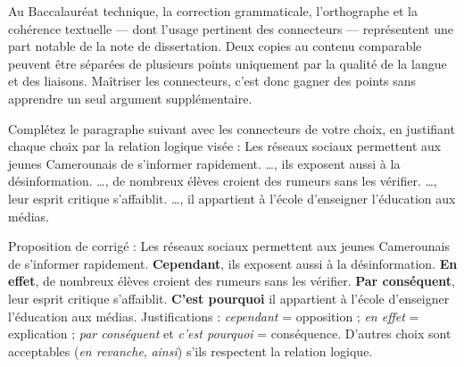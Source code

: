 \documentclass[11pt]{article}
\begin{document}
\begin{savaistu}
Au Baccalauréat technique, la correction grammaticale, l'orthographe et la cohérence textuelle --- dont l'usage pertinent des connecteurs --- représentent une part notable de la note de dissertation. Deux copies au contenu comparable peuvent être séparées de plusieurs points uniquement par la qualité de la langue et des liaisons. Maîtriser les connecteurs, c'est donc gagner des points sans apprendre un seul argument supplémentaire.
\end{savaistu}

\begin{exercice}
Complétez le paragraphe suivant avec les connecteurs de votre choix, en justifiant chaque choix par la relation logique visée : \og Les réseaux sociaux permettent aux jeunes Camerounais de s'informer rapidement. \dots{}, ils exposent aussi à la désinformation. \dots{}, de nombreux élèves croient des rumeurs sans les vérifier. \dots{}, leur esprit critique s'affaiblit. \dots{}, il appartient à l'école d'enseigner l'éducation aux médias. \fg{}
\end{exercice}

\begin{corrige}[Exercice]
Proposition de corrigé : \og Les réseaux sociaux permettent aux jeunes Camerounais de s'informer rapidement. \textbf{Cependant}, ils exposent aussi à la désinformation. \textbf{En effet}, de nombreux élèves croient des rumeurs sans les vérifier. \textbf{Par conséquent}, leur esprit critique s'affaiblit. \textbf{C'est pourquoi} il appartient à l'école d'enseigner l'éducation aux médias. \fg{} Justifications : \emph{cependant} = opposition ; \emph{en effet} = explication ; \emph{par conséquent} et \emph{c'est pourquoi} = conséquence. D'autres choix sont acceptables (\emph{en revanche}, \emph{ainsi}) s'ils respectent la relation logique.
\end{corrige}
\end{document}
